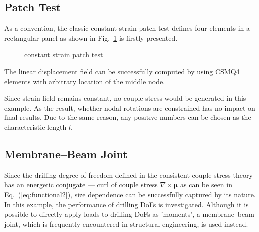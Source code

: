\documentclass[3p,sort&compress,11pt,fleqn]{elsarticle}
\newcommand*{\figref}[1]{Fig.~\ref{#1}}
\newcommand*{\eqsref}[1]{Eq.~(\ref{#1})}
\begin{document}
\subsection{Patch Test}
As a convention, the classic constant strain patch test defines four elements in a rectangular panel as shown in \figref{fig:csmq_patch} is firstly presented.
\begin{figure}[htb]
\centering\scriptsize
{}
\caption{constant strain patch test}\label{fig:csmq_patch}
\end{figure}
The linear displacement field can be successfully computed by using CSMQ4 elements with arbitrary location of the middle node.

Since strain field remains constant, no couple stress would be generated in this example. As the result, whether nodal rotations are constrained has no impact on final results. Due to the same reason, any positive numbers can be chosen as the characteristic length $l$.
\subsection{Membrane--Beam Joint}
Since the drilling degree of freedom defined in the consistent couple stress theory has an energetic conjugate --- curl of couple stress $\nabla\times\mathbold{\mu}$ as can be seen in \eqsref{eq:functional2}, size dependence can be successfully captured by its nature. In this example, the performance of drilling DoFs is investigated. Although it is possible to directly apply loads to drilling DoFs as 'moments', a membrane--beam joint, which is frequently encountered in structural engineering, is used instead.
\end{document}
